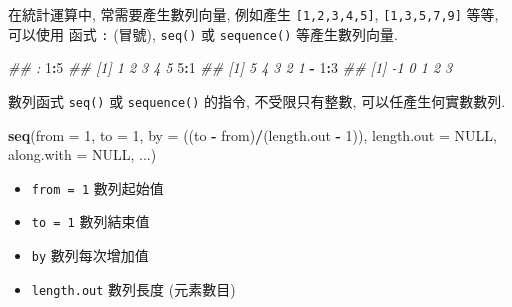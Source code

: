 \documentclass[
]{book}
\newenvironment{Shaded}{\begin{snugshade}}{\end{snugshade}}
\newcommand{\CommentTok}[1]{\textcolor[rgb]{0.56,0.35,0.01}{\textit{#1}}}
\newcommand{\DataTypeTok}[1]{\textcolor[rgb]{0.13,0.29,0.53}{#1}}
\newcommand{\DecValTok}[1]{\textcolor[rgb]{0.00,0.00,0.81}{#1}}
\newcommand{\KeywordTok}[1]{\textcolor[rgb]{0.13,0.29,0.53}{\textbf{#1}}}
\newcommand{\NormalTok}[1]{#1}
\newcommand{\OperatorTok}[1]{\textcolor[rgb]{0.81,0.36,0.00}{\textbf{#1}}}
\newcommand{\OtherTok}[1]{\textcolor[rgb]{0.56,0.35,0.01}{#1}}
\newcommand{\StringTok}[1]{\textcolor[rgb]{0.31,0.60,0.02}{#1}}
\providecommand{\tightlist}{%
  \setlength{\itemsep}{0pt}\setlength{\parskip}{0pt}}
\begin{document}
在統計運算中, 常需要產生數列向量,
例如產生
\texttt{{[}1,2,3,4,5{]}},
\texttt{{[}1,3,5,7,9{]}}
等等,
可以使用 函式
\texttt{:} (冒號),
\texttt{seq()}
或
\texttt{sequence()}
等產生數列向量.

\begin{Shaded}
\begin{Highlighting}[]
\CommentTok{\#\# :}
\DecValTok{1}\OperatorTok{:}\DecValTok{5}
\CommentTok{\#\# [1] 1 2 3 4 5}
\DecValTok{5}\OperatorTok{:}\DecValTok{1}
\CommentTok{\#\# [1] 5 4 3 2 1}
\OperatorTok{{-}}\StringTok{ }\DecValTok{1}\OperatorTok{:}\DecValTok{3}
\CommentTok{\#\# [1] {-}1  0  1  2  3}
\end{Highlighting}
\end{Shaded}

數列函式
\texttt{seq()}
或
\texttt{sequence()}
的指令, 不受限只有整數,
可以任產生何實數數列.

\begin{Shaded}
\begin{Highlighting}[]
\KeywordTok{seq}\NormalTok{(}\DataTypeTok{from =} \DecValTok{1}\NormalTok{, }\DataTypeTok{to =} \DecValTok{1}\NormalTok{, }
    \DataTypeTok{by =}\NormalTok{ ((to }\OperatorTok{{-}}\StringTok{ }\NormalTok{from)}\OperatorTok{/}\NormalTok{(length.out }\OperatorTok{{-}}\StringTok{ }\DecValTok{1}\NormalTok{)),}
    \DataTypeTok{length.out =} \OtherTok{NULL}\NormalTok{, }
    \DataTypeTok{along.with =} \OtherTok{NULL}\NormalTok{, ...)}
\end{Highlighting}
\end{Shaded}

\begin{itemize}
\tightlist
\item
  \texttt{from\ =\ 1} 數列起始值
\item
  \texttt{to\ =\ 1} 數列結束值
\item
  \texttt{by} 數列每次增加值
\item
  \texttt{length.out} 數列長度 (元素數目)
\end{itemize}
\end{document}
